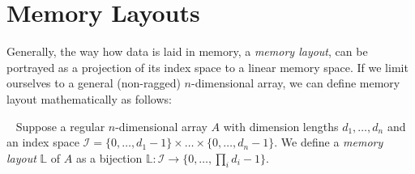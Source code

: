 \section{Memory Layouts}
\label{sec:layouts}





Generally, the way how data is laid in memory, a \emph{memory layout}, can be portrayed as a projection of its index space to a linear memory space. If we limit ourselves to a general (non-ragged) $n$-dimensional array, we can define memory layout mathematically as follows:

\begin{defn}
  \label{def:layout}
 Suppose a regular $n$-dimensional array $A$ with dimension lengths $d_1, \dots, d_n$ and an index space $\mathcal{I} = \{0,\dots,d_1 - 1\}\times \dots \times \{0,\dots,d_n - 1\}$. We define a \emph{memory layout} $\mathbb{L}$ of $A$ as a bijection $\mathbb{L}: \mathcal{I} \to \{0,\dots, \prod_{i}d_i - 1\}$.
\end{defn}

